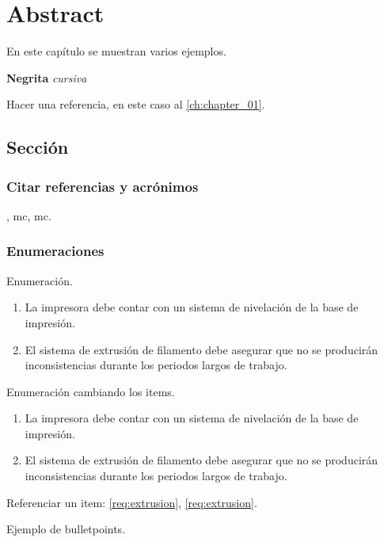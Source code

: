 \chapter{Abstract} \label{ch:chapter_01}

En este capítulo se muestran varios ejemplos.

\textbf{Negrita} \textit{cursiva}

Hacer una referencia, en este caso al \autoref{ch:chapter_01}.



\section{Sección}

\subsection{Citar referencias y acrónimos}

\cite{im78552}, \acrshort{mc}, \acrfull{mc}.

\subsection{Enumeraciones}

Enumeración.

\begin{enumerate}
	\item La impresora debe contar con un sistema de nivelación de la base de impresión.
	\item El sistema de extrusión de filamento debe asegurar que no se producirán inconsistencias durante los periodos largos de trabajo.
\end{enumerate}

Enumeración cambiando los items.

\begin{enumerate}[label= \textbf{R-\arabic*}]
	\item La impresora debe contar con un sistema de nivelación de la base de impresión.
	\item El sistema de extrusión de filamento debe asegurar que no se producirán inconsistencias durante los periodos largos de trabajo. \label{req:extrusion}
\end{enumerate}

Referenciar un item: \ref{req:extrusion}, \autoref{req:extrusion}.


Ejemplo de bulletpoints.


